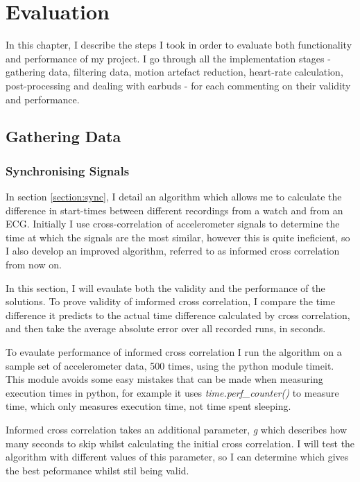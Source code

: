 \documentclass[12pt,a4paper,twoside,openright]{report}
\begin{document}
\chapter{Evaluation}

In this chapter, I describe the steps I took in order to evaluate both
functionality and performance of my project. I go through all the
implementation stages - gathering data, filtering data, motion artefact
reduction, heart-rate calculation, post-processing and dealing with earbuds -
for each commenting on their validity and performance.

\section{Gathering Data}

\subsection{Synchronising Signals}

In section \ref{section:sync}, I detail an algorithm which allows me to
calculate the difference in start-times between different recordings from a
watch and from an ECG. Initially I use cross-correlation of accelerometer signals to
determine the time at which the signals are the most similar, however this is
quite ineficient, so I also develop an improved algorithm, referred to as
informed cross correlation from now on.

In this section, I will evaulate both the validity and the performance of the
solutions. To prove validity of imformed cross correlation, I compare the
time difference it predicts to the actual time difference calculated by cross
correlation, and then take the average absolute error over all recorded runs,
in seconds. 

To evaulate performance of informed cross correlation I run the
algorithm on a sample set of accelerometer data, 500 times, using the python
module timeit. This module avoids some easy mistakes that can be made when
measuring execution times in python, for example it uses
\emph{time.perf\_counter()} to measure time, which only measures execution
time, not time spent sleeping.

Informed cross correlation takes an additional parameter,
\emph{g} which describes how many seconds to skip whilst
calculating the initial cross correlation. I will test the algorithm with different
values of this parameter, so I can determine which gives the best peformance
whilst stil being valid. 
\end{document}
